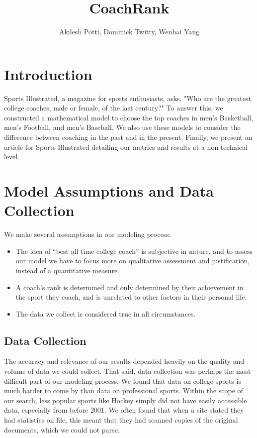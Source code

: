 \documentclass[titlepage,12pt]{article}
\begin{document}
\title{CoachRank}
\author{Akilesh Potti, Dominick Twitty, Wenhai Yang}
\maketitle


\tableofcontents

\section{Introduction}
Sports Illustrated, a magazine for sports enthusiasts, asks, "Who are the greatest college coaches, male or female, of the last century?" To answer this, we constructed a mathematical model to choose the top coaches in men's Basketball, men's Football, and men's Baseball. We also use these models to consider the difference between coaching in the past and in the present. Finally, we present an article for Sports Illustrated detailing our metrics and results at a non-technical level.

\section{Model Assumptions and Data Collection}
We make several assumptions in our modeling process:
\begin{itemize}
\item The idea of ``best all time college coach'' is subjective in nature, and to assess our model we have to focus more on qualitative assessment and justification, instead of a quantitative measure.

\item A coach's rank is determined and only determined by their achievement in the sport they coach, and is unrelated to other factors in their personal life.

\item The data we collect is considered true in all circumstances.
\end{itemize}

\subsection{Data Collection}
The accuracy and relevance of our results depended heavily on the quality and volume of data we could collect. That said, data collection was perhaps the most difficult part of our modeling process. We found that data on college sports is much harder to come by than data on professional sports. Within the scope of our search, less popular sports like Hockey simply did not have easily accessible data, especially from before 2001. We often found that when a site stated they had statistics on file, this meant that they had scanned copies of the original documents, which we could not parse.
\end{document}
